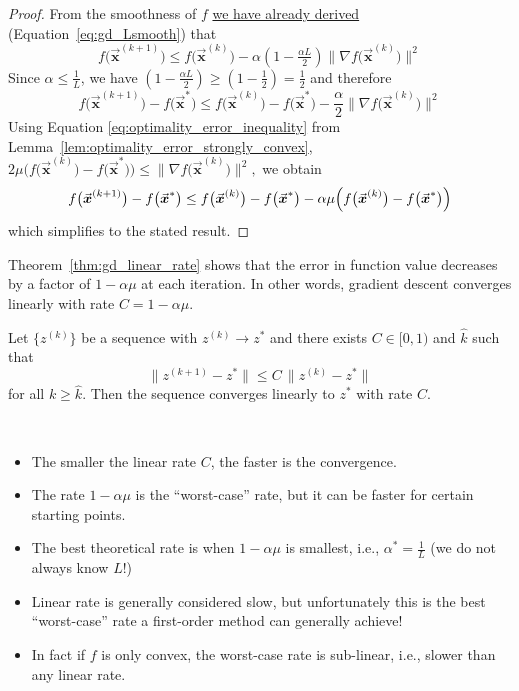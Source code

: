 \documentclass[9pt, headings=standardclasses, parskip=half]{scrartcl}
\renewcommand{\emph}[1]{\textcolor{mypurple}{#1}}
\newcommand{\vect}[1]{\vec{\boldsymbol{#1}}}
\begin{document}
\begin{proof}
From the smoothness of \(f\) \hyperref[eq:gd_Lsmooth]{we have already derived} (Equation~\ref{eq:gd_Lsmooth}) that
\[
f\bigl(\vect{x}^{(k+1)}\bigr)\le f\bigl(\vect{x}^{(k)}\bigr)
-\alpha\left(1-\tfrac{\alpha L}{2}\right)\|\nabla f\bigl(\vect{x}^{(k)}\bigr)\|^{2}
\]
Since \(\alpha \le \frac{1}{L}\), we have \(\left(1-\frac{\alpha L}{2}\right)\ge\left(1-\frac{1}{2}\right)=\frac{1}{2}\) and therefore
\[
f\bigl(\vect{x}^{(k+1)}\bigr)-f\bigl(\vect{x}^{*}\bigr)
\le f\bigl(\vect{x}^{(k)}\bigr)-f\bigl(\vect{x}^{*}\bigr)
-\frac{\alpha}{2}\|\nabla f\bigl(\vect{x}^{(k)}\bigr)\|^{2}
\]
Using Equation \eqref{eq:optimality_error_inequality} from Lemma~\ref{lem:optimality_error_strongly_convex},
\(
2\mu\bigl(f\bigl(\vect{x}^{(k)}\bigr)-f\bigl(\vect{x}^{*}\bigr)\bigr)
\le\|\nabla f\bigl(\vect{x}^{(k)}\bigr)\|^{2},
\)
we obtain
\[
f\bigl(\vect{x}^{(k+1)}\bigr)-f\bigl(\vect{x}^{*}\bigr)
\le f\bigl(\vect{x}^{(k)}\bigr)-f\bigl(\vect{x}^{*}\bigr)
-\alpha\mu\Bigl(f\bigl(\vect{x}^{(k)}\bigr)-f\bigl(\vect{x}^{*}\bigr)\Bigr)
\]
which simplifies to the stated result.
\end{proof}

Theorem~\ref{thm:gd_linear_rate} shows that the error in function value decreases by a factor of \(1-\alpha\mu\) at each iteration. In other words, gradient descent converges \emph{linearly} with rate \(C=1-\alpha\mu\).

\begin{definition}
Let \(\{z^{(k)}\}\) be a sequence with \(z^{(k)} \to z^*\) and there exists \(C \in [0,1)\) and \(\hat{k}\) such that
\[
\|z^{(k+1)}-z^{*}\|\le C\,\|z^{(k)}-z^{*}\|%
\]
for all \(k\ge \hat{k}\). Then the sequence converges \emph{linearly} to \(z^*\) with rate \(C\).
\end{definition}


\begin{remark}\
\begin{itemize}
\item The smaller the linear rate \(C\), the faster is the convergence.
\item The rate \(1-\alpha \mu\) is the ``worst-case'' rate, but it can be faster for certain starting points.
\item The best theoretical rate is when \(1-\alpha \mu\) is smallest, i.e., \(\alpha^{*}=\frac{1}{L}\) (we do not always know \(L\)!)
\item Linear rate is generally considered slow, but unfortunately this is the best ``worst-case'' rate a first-order method can generally achieve!
\item In fact if \(f\) is only convex, the worst-case rate is sub-linear, i.e., slower than any linear rate.
\end{itemize}
\end{remark}
\end{document}
